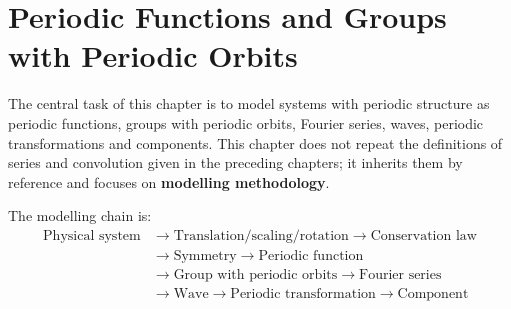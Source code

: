 \chapter{Periodic Functions and Groups with Periodic Orbits}

\begin{remark}\label{rem:periodic_function_chapter_positioning}
The central task of this chapter is to model systems with periodic structure as periodic functions, groups with periodic orbits, Fourier series, waves, periodic transformations and components. This chapter does not repeat the definitions of series and convolution given in the preceding chapters; it inherits them by reference and focuses on \textbf{modelling methodology}.

The modelling chain is:
\[
\begin{aligned}
\text{Physical system} &\longrightarrow \text{Translation/scaling/rotation} \longrightarrow \text{Conservation law} \\
&\longrightarrow \text{Symmetry} \longrightarrow \text{Periodic function} \\
&\longrightarrow \text{Group with periodic orbits} \longrightarrow \text{Fourier series} \\
&\longrightarrow \text{Wave} \longrightarrow \text{Periodic transformation} \longrightarrow \text{Component}
\end{aligned}
\]


\end{remark}
